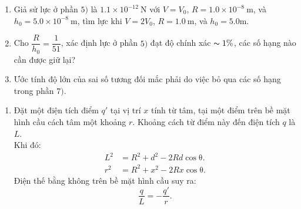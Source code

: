 \begin{vd}
\begin{enumerate}
\begin{enumerate}[1) ]
        \item Giả sử lực ở phần $5)$ là $1.1\times10^{-12}~\mathrm{N}$ với $V=V_0$, $R=1.0\times10^{-8}~\mathrm{m}$, và $h_0=5.0\times10^{-8}~\mathrm{m}$, tìm lực khi $V=2V_0$, $R=1.0~\mathrm{m}$, và $h_0=5.0\mathrm{m}$. 
        \item Cho $\dfrac{R}{h_0}=\dfrac{1}{51}$, xác định lực ở phần $5)$ đạt độ chính xác $\thicksim 1 \%$, các số hạng nào cần được giữ lại?
        \item Ước tính độ lớn của sai số tương đối mắc phải do việc bỏ qua các số hạng trong phần $7)$.
    \end{enumerate}
\end{enumerate}
\end{vd}
\begin{loigiai}
\begin{enumerate}
    \item Đặt một điện tích điểm $q'$ tại vị trí $x$ tính từ tâm, tại một điểm trên bề mặt hình cầu cách tâm một khoảng $r$. Khoảng cách từ điểm này đến điện tích $q$ là $L$.\\Khi đó:
    \begin{align*}
        L^2&=R^2+d^2-2Rd\mathrm{\cos{\theta}}. \tag{1} \label{cg2006sa.3.1}\\
        r^2&=R^2+x^2-2Rx\mathrm{\cos{\theta}}. \tag{2} \label{cg2006sa.3.2}
    \end{align*}
    Điện thế bằng không trên bề mặt hình cầu suy ra:
    \[\dfrac{q}{L}=-\dfrac{q'}{r}. \tag{3} \label{cg2006sa.3.3}\]
    \begin{center}



\begin{tikzpicture}[x=0.75pt,y=0.75pt,yscale=-1,xscale=1]


\end{tikzpicture}
\end{center}
\end{enumerate}
\end{loigiai}

